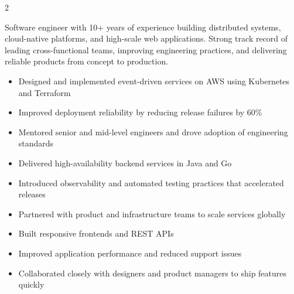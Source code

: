 \documentclass[10pt,a4paper,withhyper]{altacv}
\begin{document}


\makecvheader


\begin{paracol}{2}

Software engineer with 10+ years of experience building distributed systems, cloud-native platforms, and high-scale web applications. Strong track record of leading cross-functional teams, improving engineering practices, and delivering reliable products from concept to production.


\begin{itemize}
\item Designed and implemented event-driven services on AWS using Kubernetes and Terraform
\item Improved deployment reliability by reducing release failures by 60\%
\item Mentored senior and mid-level engineers and drove adoption of engineering standards
\end{itemize}

\divider

\begin{itemize}
\item Delivered high-availability backend services in Java and Go
\item Introduced observability and automated testing practices that accelerated releases
\item Partnered with product and infrastructure teams to scale services globally
\end{itemize}

\divider

\begin{itemize}
\item Built responsive frontends and REST APIs
\item Improved application performance and reduced support issues
\item Collaborated closely with designers and product managers to ship features quickly
\end{itemize}


\end{paracol}
\end{document}
